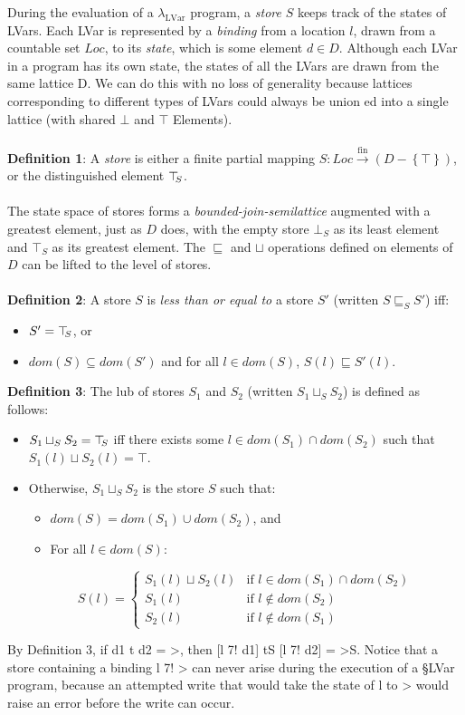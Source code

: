 \documentclass[twocolumn]{article}
\newcommand{\lambdaLVar}{\ensuremath{\lambda_{\textrm{LVar}}}}
\newcommand{\userleq}{\ensuremath{\sqsubseteq}}
\newcommand{\Loc}{\mathit{Loc}}
\newcommand{\fmap}{\ensuremath{\stackrel{\textrm{fin}}{\rightarrow}}}
\newcommand{\setof}[1]{\left\{#1\right\}}
\newcommand{\topS}{\ensuremath{\top\hspace{-0.85mm}_{S}}}
\newcommand{\leqstore}[2]{\ensuremath{#1 \userleq_S #2}}
\newcommand{\dom}[1]{\ensuremath{\mathit{dom}(#1)}}
\newcommand{\lubstore}[2]{\ensuremath{#1 \sqcup_{S} #2}}
\newcommand{\userlub}[2]{\ensuremath{#1 \sqcup #2}}
\begin{document}
During the evaluation of a $\lambdaLVar$ program, a \emph{store} $S$ keeps track of the states of LVars. Each LVar is represented by a \emph{binding} from a location $l$, drawn from a countable set $\Loc$, to its \emph{state}, which is some element $d \in D$. Although each LVar in a program has its own state, the states of all the LVars are drawn from the same lattice D. We can do this with no loss of generality because lattices corresponding to different types of LVars could always be union ed into a single lattice (with shared $\bot$ and $\top$ Elements). \\ \\
\textbf{Definition 1}: A \emph{store} is either a finite partial mapping $S : \Loc \fmap (D - \setof{\top})$, or the distinguished element $\topS$. \\ \\
The state space of stores forms a \emph{bounded-join-semilattice} augmented with a greatest element, just as $D$ does, with the empty store $\bot_S$ as its least element and $\top_S$ as its greatest element. The $\userleq$ and $\sqcup$ operations defined on elements of $D$ can be lifted to the level of stores.\\ \\
\textbf{Definition 2}: 
 A store $S$ is \emph{less than or equal to} a store $S'$ (written
$\leqstore{S}{S'}$) iff:
\begin{itemize}
\item $S' = \topS$, or
\item $\dom{S} \subseteq \dom{S'}$ and for all $l
\in \dom{S}$, $S(l) \userleq S'(l)$.
\end{itemize}

\textbf{Definition 3}:  The lub of stores $S_1$ and $S_2$ (written $\lubstore{S_1}{S_2}$) is
defined as follows:
\begin{itemize}
\item $\lubstore{S_1}{S_2} = \topS$ iff there exists some $l \in
\dom{S_1} \cap \dom{S_2}$ such that $\userlub{S_1(l)}{S_2(l)} = \top$.
\item Otherwise, $\lubstore{S_1}{S_2}$ is the store $S$ such that:
\begin{itemize}
\item $\dom{S} = \dom{S_1} \cup \dom{S_2}$, and
\item For all $l \in \dom{S}$:
\end{itemize}
\begin{displaymath}
S(l) = \left\{ \begin{array}{ll}
\userlub{S_1(l)}{S_2(l)} & \textrm{if $l \in \dom{S_1} \cap \dom{S_2}$} \\
S_1(l) & \textrm{if $l \notin \dom{S_2}$} \\
S_2(l) & \textrm{if $l \notin \dom{S_1}$}
\end{array} \right.
\end{displaymath}
\end{itemize}
By Definition 3, if d1 t d2 = >, then [l 7! d1] tS [l 7! d2] = >S. Notice that a store containing a binding l 7! > can never arise during the execution of a §LVar program, because an attempted write that would take the state of l to > would raise an error before the write can occur.
\end{document}
